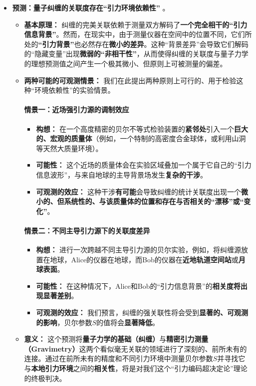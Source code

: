 \documentclass[11pt, a4paper]{article}
\begin{document}
\begin{itemize}
    \item \textbf{预测：量子纠缠的关联度存在“引力环境依赖性”} \cite{Bell1964}。

    \begin{itemize}
        \item \textbf{基本原理：}
        纠缠的完美关联依赖于测量双方解码了\textbf{一个完全相干的“引力信息背景”}。然而，在现实中，由于测量仪器在空间中的位置不同，它们所处的\textbf{“引力背景”}也必然存在\textbf{微小的差异}。这种“背景差异”会导致它们解码的“隐藏变量”出现\textbf{微弱的“非相干性”}，从而使得纠缠的关联度与量子力学的理想预测值之间产生一个极其微小、但原则上可被测量的偏差。

        \item \textbf{两种可能的可观测情景：}
        我们在此提出两种原则上可行的、用于检验这种“环境依赖性”的实验情景。

        \paragraph{情景一：近场强引力源的调制效应}
        \begin{itemize}
            \item \textbf{构想：} 在一个高度精密的贝尔不等式检验装置的\textbf{紧邻处}引入一个\textbf{巨大的、宏观的质量体}（例如，一个特制的高密度合金球体，或利用山洞等天然大质量环境）。
            \item \textbf{可能性：} 这个近场的质量体会在实验区域叠加一个属于它自己的“引力信息波形”，与来自地球的主导背景场发生\textbf{复杂的干涉}。
            \item \textbf{可观测的效应：} 这种干涉\textbf{有可能}会导致纠缠的统计关联度出现一个\textbf{微小的、但系统性的、与该质量体的位置和存在与否相关的“漂移”或“变化”}。
        \end{itemize}

        \paragraph{情景二：不同主导引力源下的关联度差异}
        \begin{itemize}
            \item \textbf{构想：} 进行一次跨越不同主导引力源的贝尔实验，例如，将纠缠源放置在地球，Alice的仪器在地球，而Bob的仪器在\textbf{近地轨道空间站}或\textbf{月球表面}。
            \item \textbf{可能性：} 在这种情况下，Alice和Bob的“引力信息背景”的\textbf{相关度将出现显著差别}。
            \item \textbf{可观测的效应：} 我们预言，纠缠的强关联性将会受到\textbf{显著的、可观测的影响}，贝尔参数$S$的值将会\textbf{显著降低}。
        \end{itemize}

        \item \textbf{意义：}
        这个预测将\textbf{量子力学的基础（纠缠）}与\textbf{精密引力测量（Gravimetry）}这两个看似毫无关联的领域进行了深刻的、前所未有的连接。通过在前所未有的精度和不同引力环境中测量贝尔参数$S$并寻找它与\textbf{本地引力环境}之间的\textbf{相关性}，将是对我们这个“引力编码超决定论”理论的终极判决。
    \end{itemize}
\end{itemize}
\end{document}

